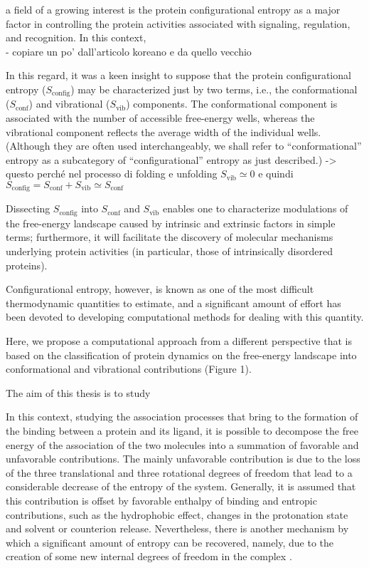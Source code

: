 a field of a growing interest is the protein configurational entropy as a major factor in controlling the protein activities associated with signaling, regulation, and recognition.
In this context, \\
- copiare un po' dall'articolo koreano e da quello vecchio

\newpage

In this regard, it was a keen insight to suppose that the protein configurational entropy ($S_\text{config}$) may be characterized just by two terms, i.e., the conformational ($S_\text{conf}$) and vibrational ($S_\text{vib}$) components.
The conformational component is associated with the number of accessible free-energy wells, whereas the vibrational component reflects the average width of the individual wells. (Although they are often used interchangeably, we shall refer to ``conformational'' entropy as a subcategory of ``configurational'' entropy as just described.) -> questo perché nel processo di folding e unfolding $S_\text{vib} \simeq 0$ e quindi $S_\text{config} = S_\text{conf} + S_\text{vib} \simeq S_\text{conf}$

Dissecting $S_\text{config}$ into $S_\text{conf}$ and $S_\text{vib}$ enables one to characterize modulations of the free-energy landscape caused by intrinsic and extrinsic factors in simple terms; furthermore, it will facilitate the discovery of molecular mechanisms underlying protein activities (in particular, those of intrinsically disordered proteins).

Configurational entropy, however, is known as one of the most difficult thermodynamic quantities to estimate, and a significant amount of effort has been devoted to developing computational methods for dealing with this quantity. 

Here, we propose a computational approach from a different perspective that is based on the classification of protein
dynamics on the free-energy landscape into conformational and vibrational contributions (Figure 1). 


\cite{karplus1987configurational}

The aim of this thesis is to study 
\newpage

In this context, studying the association processes that bring to the formation of the binding between a protein and its ligand, it is possible to decompose the free energy of the association of the two molecules into a summation of favorable and unfavorable contributions. The mainly unfavorable contribution is due to the loss of the three translational and three rotational degrees of freedom that lead to a considerable decrease of the entropy of the system. Generally, it is assumed that this contribution is offset by favorable enthalpy of binding and entropic contributions, such as the hydrophobic effect, changes in the protonation state and solvent or counterion release. Nevertheless, there is another mechanism by which a significant amount of entropy can be recovered, namely, due to the creation of some new internal degrees of freedom in the complex \cite{tidor1994contribution}.

